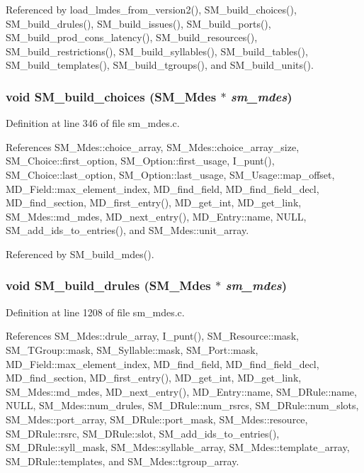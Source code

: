 Referenced by load\_\-lmdes\_\-from\_\-version2(), SM\_\-build\_\-choices(), SM\_\-build\_\-drules(), SM\_\-build\_\-issues(), SM\_\-build\_\-ports(), SM\_\-build\_\-prod\_\-cons\_\-latency(), SM\_\-build\_\-resources(), SM\_\-build\_\-restrictions(), SM\_\-build\_\-syllables(), SM\_\-build\_\-tables(), SM\_\-build\_\-templates(), SM\_\-build\_\-tgroups(), and SM\_\-build\_\-units().
\subsubsection{\setlength{\rightskip}{0pt plus 5cm}void SM\_\-build\_\-choices (\bf{SM\_\-Mdes} $\ast$ {\em sm\_\-mdes})}\label{sm__mdes_8c_b5ef49aff752297f821c77bc1cff26eb}




Definition at line 346 of file sm\_\-mdes.c.

References SM\_\-Mdes::choice\_\-array, SM\_\-Mdes::choice\_\-array\_\-size, SM\_\-Choice::first\_\-option, SM\_\-Option::first\_\-usage, I\_\-punt(), SM\_\-Choice::last\_\-option, SM\_\-Option::last\_\-usage, SM\_\-Usage::map\_\-offset, MD\_\-Field::max\_\-element\_\-index, MD\_\-find\_\-field, MD\_\-find\_\-field\_\-decl, MD\_\-find\_\-section, MD\_\-first\_\-entry(), MD\_\-get\_\-int, MD\_\-get\_\-link, SM\_\-Mdes::md\_\-mdes, MD\_\-next\_\-entry(), MD\_\-Entry::name, NULL, SM\_\-add\_\-ids\_\-to\_\-entries(), and SM\_\-Mdes::unit\_\-array.

Referenced by SM\_\-build\_\-mdes().
\subsubsection{\setlength{\rightskip}{0pt plus 5cm}void SM\_\-build\_\-drules (\bf{SM\_\-Mdes} $\ast$ {\em sm\_\-mdes})}\label{sm__mdes_8c_1be740203a9e5470203daf8674c3fe2d}




Definition at line 1208 of file sm\_\-mdes.c.

References SM\_\-Mdes::drule\_\-array, I\_\-punt(), SM\_\-Resource::mask, SM\_\-TGroup::mask, SM\_\-Syllable::mask, SM\_\-Port::mask, MD\_\-Field::max\_\-element\_\-index, MD\_\-find\_\-field, MD\_\-find\_\-field\_\-decl, MD\_\-find\_\-section, MD\_\-first\_\-entry(), MD\_\-get\_\-int, MD\_\-get\_\-link, SM\_\-Mdes::md\_\-mdes, MD\_\-next\_\-entry(), MD\_\-Entry::name, SM\_\-DRule::name, NULL, SM\_\-Mdes::num\_\-drules, SM\_\-DRule::num\_\-rsrcs, SM\_\-DRule::num\_\-slots, SM\_\-Mdes::port\_\-array, SM\_\-DRule::port\_\-mask, SM\_\-Mdes::resource, SM\_\-DRule::rsrc, SM\_\-DRule::slot, SM\_\-add\_\-ids\_\-to\_\-entries(), SM\_\-DRule::syll\_\-mask, SM\_\-Mdes::syllable\_\-array, SM\_\-Mdes::template\_\-array, SM\_\-DRule::templates, and SM\_\-Mdes::tgroup\_\-array.

